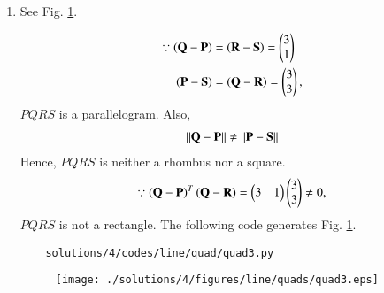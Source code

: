 \begin{enumerate}
\item See Fig. 	\ref{fig:3.5.4_quadrilateral3}.

\begin{align}
\because \left(\mathbf{Q} - \mathbf{P}\right) &= \left(\mathbf{R} - \mathbf{S}\right) = \begin{pmatrix}3\\1\end{pmatrix}
\\
\left(\mathbf{P} - \mathbf{S}\right) &= \left(\mathbf{Q} - \mathbf{R}\right) = \begin{pmatrix}3\\3\end{pmatrix},
\end{align}
$PQRS$ is a parallelogram.  Also, 
%
\begin{align}
\left\lVert\mathbf{Q} - \mathbf{P}\right\rVert \ne \left\lVert\mathbf{P} - \mathbf{S}\right\rVert
\end{align}
Hence, $PQRS$ is neither a rhombus nor a square.
\begin{align}
\because \left(\mathbf{Q} - \mathbf{P}\right)^T \left(\mathbf{Q} - \mathbf{R}\right) = \begin{pmatrix}3 & 1\end{pmatrix}\begin{pmatrix}3\\3\end{pmatrix} \ne 0,
\end{align}
$PQRS$ is not a rectangle. The following code generates Fig. 	\ref{fig:3.5.4_quadrilateral3}.
	\begin{lstlisting}
	solutions/4/codes/line/quad/quad3.py
	\end{lstlisting}

\begin{figure}[!ht]
	\centering
	\texttt{[image: ./solutions/4/figures/line/quads/quad3.eps]}
	\caption{}
	\label{fig:3.5.4_quadrilateral3}
\end{figure}
\renewcommand{\thefigure}{\theenumi}

\end{enumerate}
